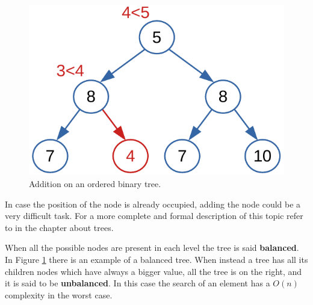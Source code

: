 \begin{figure}[H]
	\begin{center}
		\includegraphics[scale=.6]{chapters/trees/images/trees_14.pdf}
		\caption[Addition on an ordered binary tree.]{Addition on an ordered binary tree.}
		\label{trees_14}
	\end{center}
\end{figure}

In case the position of the node is already occupied, adding the node could be a very difficult task. For a more complete and formal description of this topic refer to \cite{goodrich2013data} in the chapter about trees.

When all the possible nodes are present in each level the tree is said \textbf{balanced}. In Figure \ref{trees_14} there is an example of a balanced tree.
When instead a tree has all its children nodes which have always a bigger value, all the tree is on the right, and it is said to be \textbf{unbalanced}. In this case the search of an element has a \(O(n)\) complexity in the worst case.

